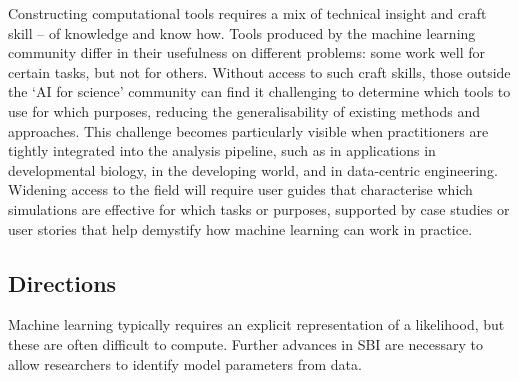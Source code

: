 Constructing computational tools requires a mix of technical insight and
craft skill -- of knowledge and know how. Tools produced by the machine
learning community differ in their usefulness on different problems:
some work well for certain tasks, but not for others. Without access to
such craft skills, those outside the `AI for science' community can find
it challenging to determine which tools to use for which purposes,
reducing the generalisability of existing methods and approaches. This
challenge becomes particularly visible when practitioners are tightly
integrated into the analysis pipeline, such as in applications in
developmental biology, in the developing world, and in data-centric
engineering. Widening access to the field will require user guides that
characterise which simulations are effective for which tasks or
purposes, supported by case studies or user stories that help demystify
how machine learning can work in practice.

\hypertarget{directions}{%
\subsection{Directions}\label{directions}}

Machine learning typically requires an explicit representation of a
likelihood, but these are often difficult to compute. Further advances
in SBI are necessary to allow researchers to identify model parameters
from data.

